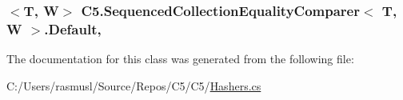 \subsubsection[{Default}]{$<$T, W$>$ {\bf C5.\+Sequenced\+Collection\+Equality\+Comparer}$<$ T, W $>$.Default\hspace{0.3cm}{\ttfamily [static]}, {\ttfamily [get]}}\label{class_c5_1_1_sequenced_collection_equality_comparer_a08533bba877e245d646cc4226a4d2222}






The documentation for this class was generated from the following file\+:\begin{DoxyCompactItemize}
\item 
C\+:/\+Users/rasmusl/\+Source/\+Repos/\+C5/\+C5/\hyperlink{_hashers_8cs}{Hashers.\+cs}\end{DoxyCompactItemize}

